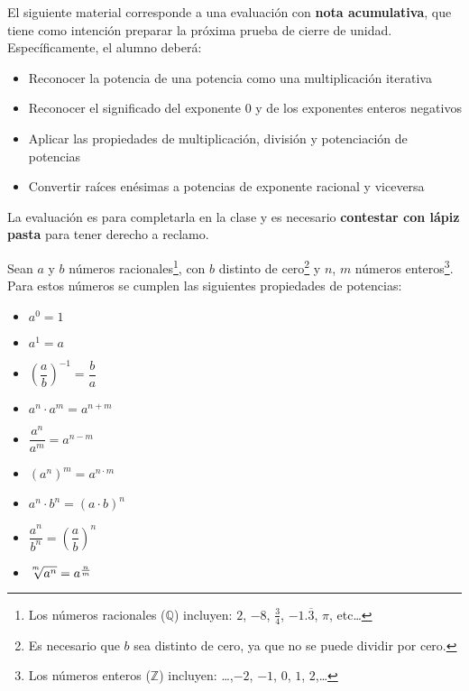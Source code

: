 \documentclass{prueba}
\begin{document}

El siguiente material corresponde a una evaluación con {\bfseries nota acumulativa}, que 
tiene como intención preparar la próxima prueba de cierre de unidad. Específicamente,
el alumno deberá:

\begin{itemize}[noitemsep]
    \item Reconocer la potencia de una potencia como una multiplicación iterativa
    \item Reconocer el significado del exponente 0 y de los exponentes enteros 
    negativos
    \item Aplicar las propiedades de multiplicación, división y potenciación de 
    potencias
    \item Convertir raíces enésimas a potencias de exponente racional y viceversa
\end{itemize}

La evaluación es para completarla en la clase y es necesario {\bfseries contestar con lápiz pasta}
para tener derecho a reclamo.


Sean $a$ y $b$ números racionales\footnote{Los números racionales ($\mathbb{Q}$) incluyen: $2$, $-8$, $\frac{3}{4}$, $-1.\overline{3}$, $\pi$, etc\dots},
con $b$ distinto de cero\footnote{Es necesario que $b$ sea distinto de cero, ya que no se puede dividir por cero.}
y $n$, $m$ números enteros\footnote{Los números enteros ($\mathbb{Z}$) incluyen: \dots,$-2$, $-1$, $0$, $1$, $2$,\dots}. 
Para estos números se cumplen las siguientes propiedades de potencias:

\begin{multicols}{3}
    \begin{itemize}[label={$\color{primarycolor}\diamond$}]
        \item $a^0 = 1$
        \item $a^1 = a$
        \item $\left(\dfrac{a}{b}\right)^{-1} = \dfrac{b}{a}$
        \item $a^n \cdot a^m = a^{n+m}$
        \item $\dfrac{a^n}{a^m} = a^{n-m}$
        \item $\left(a^n\right)^m = a^{n\cdot m}$
        \item $a^n \cdot b^n = \left(a\cdot b\right)^n$
        \item $\dfrac{a^n}{b^n} = \left(\dfrac{a}{b}\right)^n$
        \item $\sqrt[\uproot{3}\leftroot{1}m]{a^n} = a^{\frac{n}{m}}$
    \end{itemize}
\end{multicols}
\end{document}
